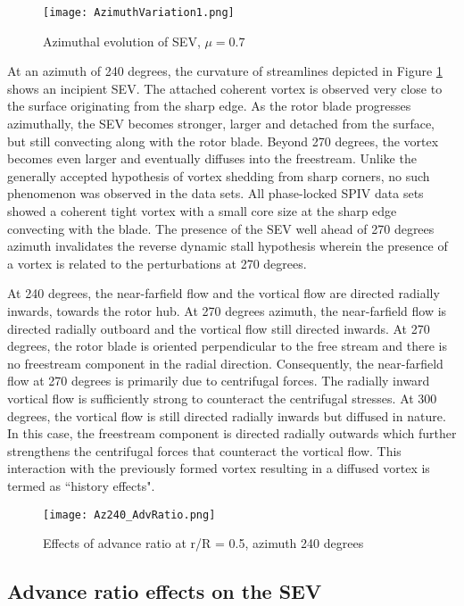 \documentclass[%
 reprint,
 showkeys,
 amsmath,amssymb,
 aps,
]{revtex4-1}
\begin{document}
\begin{figure}[!t]
\center
\texttt{[image: AzimuthVariation1.png]}
\caption{Azimuthal evolution of SEV, $\mu = 0.7$ }
\label{AzimuthVariation1}
\end{figure}

At an azimuth of 240 degrees, the curvature of streamlines depicted in Figure \ref{AzimuthVariation1} shows an incipient SEV. The attached coherent vortex is observed very close to the surface originating from the sharp edge.  As the rotor blade progresses azimuthally, the SEV becomes stronger, larger and detached from the surface, but still convecting along with the rotor blade. Beyond 270 degrees, the vortex becomes even larger and eventually diffuses into the freestream. Unlike the generally accepted hypothesis of vortex shedding from sharp corners, no such phenomenon was observed in the data sets. All phase-locked SPIV data sets showed a coherent tight vortex with a small core size at the sharp edge convecting with the blade. The presence of the SEV well ahead of 270 degrees azimuth invalidates the reverse dynamic stall hypothesis wherein the presence of a vortex is related to the perturbations at 270 degrees.

At 240 degrees, the near-farfield flow and the vortical flow are directed radially inwards, towards the rotor hub. At 270 degrees azimuth, the near-farfield flow is directed radially outboard and the vortical flow still directed inwards. At 270 degrees, the rotor blade is oriented perpendicular to the free stream and there is no freestream component in the radial direction. Consequently, the near-farfield flow at 270 degrees is primarily due to centrifugal forces. The radially inward vortical flow is sufficiently strong to counteract the centrifugal stresses. At 300 degrees, the vortical flow is still directed radially inwards but diffused in nature. In this case, the freestream component is directed radially outwards which further strengthens the centrifugal forces that counteract the vortical flow. This interaction with the previously formed vortex resulting in a diffused vortex is termed as ``history effects".      

\begin{figure}[!t]
\center
\texttt{[image: Az240\_AdvRatio.png]}
\caption{Effects of advance ratio at r/R = 0.5, azimuth 240 degrees}
\label{Az240_AdvRatio}
\end{figure}

\subsection{Advance ratio effects on the SEV}
\end{document}
